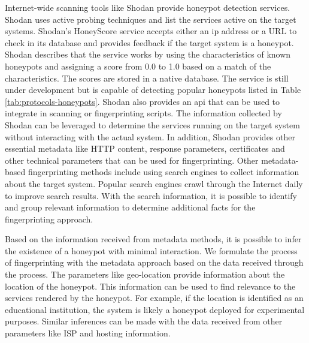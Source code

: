 Internet-wide scanning tools like Shodan provide honeypot detection services. Shodan uses active probing techniques and list the services active on the target systems. Shodan's HoneyScore service accepts either an \acrshort{ip} address or a URL to check in its database and provides feedback if the target system is a honeypot. Shodan describes that the service works by using the characteristics of known honeypots and assigning a score from 0.0 to 1.0 based on a match of the characteristics. The scores are stored in a native database. The service is still under development but is capable of detecting popular honeypots listed in Table \ref{tab:protocols-honeypots}. Shodan also provides an \acrshort{api} that can be used to integrate in scanning or fingerprinting scripts. The information collected by Shodan can be leveraged to determine the services running on the target system without interacting with the actual system. In addition, Shodan provides other essential metadata like HTTP content, response parameters, certificates and other technical parameters that can be used for fingerprinting. Other metadata-based fingerprinting methods include using search engines to collect information about the target system. Popular search engines crawl through the Internet daily to improve search results. With the search information, it is possible to identify and group relevant information to determine additional facts for the fingerprinting approach. 

Based on the information received from metadata methods, it is possible to infer the existence of a honeypot with minimal interaction. We formulate the process of fingerprinting with the metadata approach based on the data received through the process. The parameters like geo-location provide information about the location of the honeypot. This information can be used to find relevance to the services rendered by the honeypot. For example, if the location is identified as an educational institution, the system is likely a honeypot deployed for experimental purposes. Similar inferences can be made with the data received from other parameters like ISP and hosting information. 
